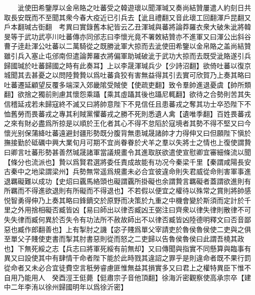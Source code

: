 　　泚使田希鑒厚以金帛賂之吐蕃受之韓遊瓌以聞渾瑊又奏尚結贊屢遣人約刻日共取長安既而不至聞其衆今春大疫近已引兵去【泚且禮翻又音此瓌工回翻渾戶昆翻又戶本翻瑊古衘翻　考異曰實錄舊本紀皆云乙丑渾瑊與蕃將論莽羅衣衆大破朱泚將韓旻等于武功武亭川吐蕃傳亦同邠志曰李懷光竟不署敇結贊亦不進軍又曰渾公出斜谷曹子逹赴渾公吐蕃以二萬騎從之既勝泚軍大掠而去泚使田希鑒以金帛賂之盖尚結贊雖引兵入塞止屯邠南但遣論莾羅衣將偏軍助瑊破泚于武功大掠而去既受泚賂遂引兵歸國瑊於吐蕃歸國之時有此奏耳】上以李晟渾瑊兵少【少詩沼翻】欲倚吐蕃以復京城聞其去甚憂之以問陸贄贄以爲吐蕃貪狡有害無益得其引去實可欣賀乃上奏其略曰吐蕃遷延顧望反覆多端深入郊畿隂受賊使【使疏吏翻】致令羣帥進退憂虞【帥所類翻】欲捨之獨前則慮其懷怨乘躡【乘其虛躡其後也躡尼輒翻】欲待之合勢則苦其失信稽延戎若未歸寇終不滅又曰將帥意陛下不見信任且患蕃戎之奪其功士卒恐陛下不恤舊勞而畏蕃戎之專其利賊黨懼蕃戎之勝不死則悉遺人禽【遺唯季翻】百姓畏蕃戎之來有財必盡爲所掠是以順於王化者其心不得不怠䧟於寇境者其勢不得不堅又曰今懷光别保蒲絳吐蕃遠避封疆形勢既分腹背無患瑊晟諸帥才力得伸又曰但願陛下愼於撫接勤於砥礪中興大業旬月可期不宜尚眷眷於犬羊之羣以失將士之情也上復使謂贄曰卿言吐蕃形勢甚善然瑊晟諸軍當議規畫令其進取朕欲遣使宣慰卿宜審細條流以聞【條分也流派也】贄以爲賢君選將委任責成故能有功况今秦梁千里【秦謂咸陽長安古秦中之地梁謂梁州】兵勢無常遥爲規畫未必合宜彼違命則失君威從命則害軍事進退羈礙難以成功【史炤曰覊馬絡頭也礙謂覊所掛礙也余謂贄言羈礙者蓋謂欲進則有所羈而不得進欲退則有所礙而不得退也】不若假以便宜之權待以殊常之賞則將帥感悦智勇得伸乃上奏其略曰鋒鏑交於原野而决策於九重之中機會變於斯須而定計於千里之外用捨相礙否臧皆凶【易曰師出以律否臧凶王弼注曰齊衆以律失律則散律不可失失律而臧何異於否失令有功法所不赦故師出不以律否臧皆凶陸德明釋文曰否音鄙惡也臧作郎翻善也】上有掣肘之譏【宓子賤爲單父宰請吏於魯侯魯侯使二吏與之俱至單父子賤使吏書而掣其肘書惡則從而怒之二吏歸以告魯侯魯侯曰此謂吾橈其政也】下無死綏之志【兵志曰將軍死綏有前無却】又曰傳聞與指實不同懸算與臨事有異又曰設使其中有肆情干命者陛下能於此時戮其違詔之罪乎是則違命者既不果行罰從命者又未必合宜徒費空言秖勞睿慮匪惟無益其損實多又曰君上之權特異臣下惟不自用乃能用人　癸酉涇王侹薨【侹肅宗子音他頂翻】徐海沂密觀察使高承宗卒【建中二年李洧以徐州歸國明年以爲徐沂密】

